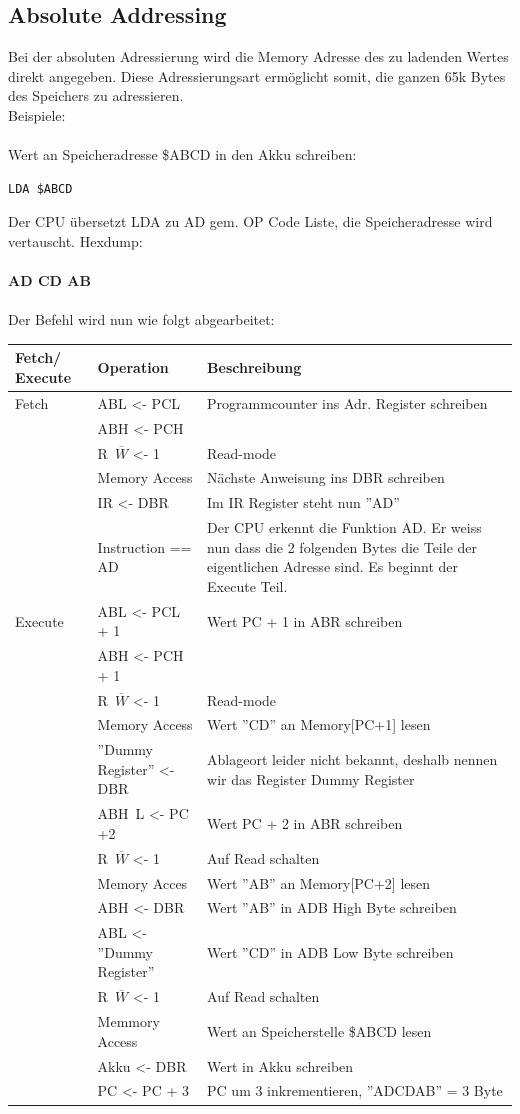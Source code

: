 \documentclass[a4paper,10pt]{report}
\begin{document}
\subsection{Absolute Addressing}
Bei der absoluten Adressierung wird die Memory Adresse des zu ladenden Wertes direkt angegeben. Diese Adressierungsart ermöglicht somit, die ganzen 65k Bytes des Speichers zu adressieren. \\
Beispiele:\\ \\
Wert an Speicheradresse \$ABCD in den Akku schreiben:\\
\begin{lstlisting}[]
LDA $ABCD
\end{lstlisting}
Der CPU übersetzt LDA zu AD gem. OP Code Liste, die Speicheradresse wird vertauscht. Hexdump:
\\\\
\textbf{AD CD AB}
\\\\
Der Befehl wird nun wie folgt abgearbeitet:\\
\begin{tabularx}{\textwidth}{l|l|X}
Fetch/ Execute & Operation & Beschreibung \\ \hline 
Fetch&ABL <- PCL & Programmcounter ins Adr. Register schreiben\\
 &ABH <- PCH & \\
 &R\ $\overline{W}$ <- 1 & Read-mode\\
 &Memory Access & Nächste Anweisung ins DBR schreiben\\
 &IR <- DBR & Im IR Register steht nun ''AD''\\
 & Instruction == AD & Der CPU erkennt die Funktion AD. Er weiss nun dass die 2 folgenden Bytes die Teile der eigentlichen Adresse sind. Es beginnt der Execute Teil.\\
Execute&ABL <- PCL + 1 &  Wert PC + 1 in ABR schreiben\\
 &ABH <- PCH + 1 &  \\
 &R\ $\overline{W}$ <- 1 & Read-mode\\
 &Memory Access & Wert ''CD'' an Memory[PC+1] lesen\\
 &''Dummy Register'' <- DBR &Ablageort leider nicht bekannt, deshalb nennen wir das Register Dummy Register\\
 &ABH\ L <- PC +2 &  Wert PC + 2 in ABR schreiben\\
 &R\ $\overline{W}$ <- 1 & Auf Read schalten\\
 &Memory Acces &  Wert ''AB'' an Memory[PC+2] lesen\\
 &ABH <- DBR & Wert ''AB'' in ADB High Byte schreiben \\
 &ABL <- ''Dummy Register'' & Wert ''CD'' in ADB Low Byte schreiben\\
 &R\ $\overline{W}$ <- 1 & Auf Read schalten\\
 &Memmory Access & Wert an Speicherstelle \$ABCD lesen\\
 &Akku <- DBR & Wert in Akku schreiben\\
 &PC <- PC + 3 & PC um 3 inkrementieren, ''ADCDAB'' = 3 Byte\\
\end{tabularx}
\end{document}
